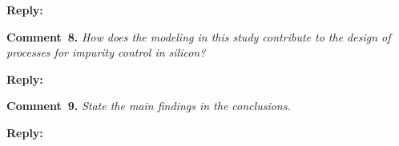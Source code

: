 \documentclass[a4paper,fleqn]{cas-sc}
\begin{document}
\noindent
\textcolor[rgb]{0.51,0.00,0.00}{\textbf{Reply:}}




\noindent
\textcolor[rgb]{0.00,0.50,1.00}{\textbf{Comment~8.}}
\emph{How does the modeling in this study contribute to the design of processes for impurity control in silicon?}

\noindent
\textcolor[rgb]{0.51,0.00,0.00}{\textbf{Reply:}}




\noindent
\textcolor[rgb]{0.00,0.50,1.00}{\textbf{Comment~9.}}
\emph{State the main findings in the conclusions.}

\noindent
\textcolor[rgb]{0.51,0.00,0.00}{\textbf{Reply:}}



%
\end{document}
